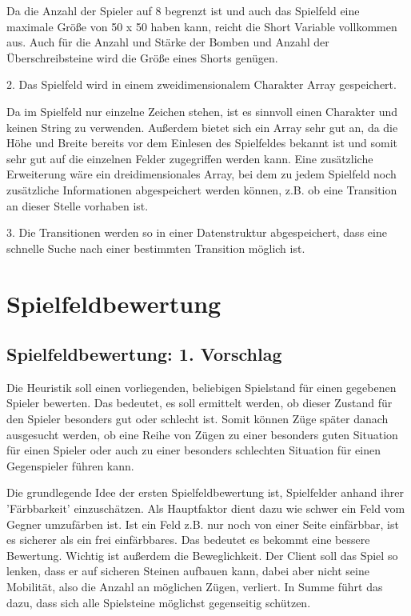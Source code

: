 \documentclass[12pt,a4paper,bibliography=totocnumbered,listof=totocnumbered]{scrartcl}
\begin{document}
Da die Anzahl der Spieler auf 8 begrenzt ist und auch das Spielfeld eine maximale Größe von 50 x 50 haben kann, reicht die Short Variable vollkommen aus. Auch für die Anzahl und Stärke der Bomben und Anzahl der Überschreibsteine wird die Größe eines Shorts genügen.

2. Das Spielfeld wird in einem zweidimensionalem Charakter Array gespeichert.

Da im Spielfeld nur einzelne Zeichen stehen, ist es sinnvoll einen Charakter und keinen String zu verwenden. Außerdem bietet sich ein Array sehr gut an, da die Höhe und Breite bereits vor dem Einlesen des Spielfeldes bekannt ist und somit sehr gut auf die einzelnen Felder zugegriffen werden kann.
Eine zusätzliche Erweiterung wäre ein dreidimensionales Array, bei dem zu jedem Spielfeld noch zusätzliche Informationen abgespeichert werden können, z.B. ob eine Transition an dieser Stelle vorhaben ist.

3. Die Transitionen werden so in einer Datenstruktur abgespeichert, dass eine schnelle Suche nach einer bestimmten Transition möglich ist. 


\newpage
\section{Spielfeldbewertung}
\subsection{Spielfeldbewertung: 1. Vorschlag}
Die Heuristik soll einen vorliegenden, beliebigen Spielstand für einen gegebenen Spieler bewerten. Das bedeutet, es soll ermittelt werden, ob dieser Zustand für den Spieler besonders gut oder schlecht ist. Somit können Züge später danach ausgesucht werden, ob eine Reihe von Zügen zu einer besonders guten Situation für einen Spieler oder auch zu einer besonders schlechten Situation für einen Gegenspieler führen kann.  

Die grundlegende Idee der ersten Spielfeldbewertung ist, Spielfelder anhand ihrer 'Färbbarkeit' einzuschätzen. Als Hauptfaktor dient dazu wie schwer ein Feld vom Gegner umzufärben ist. Ist ein Feld z.B. nur noch von einer Seite einfärbbar, ist es sicherer als ein frei einfärbbares. Das bedeutet es bekommt eine bessere Bewertung. Wichtig ist außerdem die Beweglichkeit. Der Client soll das Spiel so lenken, dass er auf sicheren Steinen aufbauen kann, dabei aber nicht seine Mobilität, also die Anzahl an möglichen Zügen, verliert. In Summe führt das dazu, dass sich alle Spielsteine möglichst gegenseitig schützen.
\end{document}

